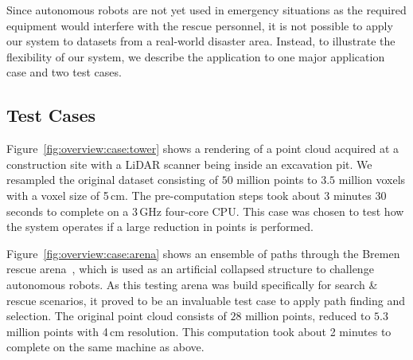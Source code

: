 \documentclass[conference,10pt,letter]{IEEEtran}
\begin{document}
Since autonomous robots are not yet used in emergency situations as the required equipment would interfere with the rescue personnel, it is not possible to apply our system to datasets from a real-world disaster area. Instead, to illustrate the flexibility of our system, we describe the application to one major application case and two test cases.

\subsection{Test Cases} \label{sec:results:testcases}
 Figure~\ref{fig:overview:case:tower} shows a rendering of a point cloud acquired at a construction site with a LiDAR scanner being inside an excavation pit. We resampled the original dataset consisting of $50$ million points to $3.5$ million voxels with a voxel size of 5\,cm. The pre-computation steps took about 3 minutes 30 seconds to complete on a 3\,GHz four-core CPU. This case was chosen to test how the system operates if a large reduction in points is performed.

 Figure~\ref{fig:overview:case:arena} shows an ensemble of paths through the Bremen rescue arena~\cite{varsadan08}, which is used as an artificial collapsed structure to challenge autonomous robots. As this testing arena was build specifically for search \& rescue scenarios, it proved to be an invaluable test case to apply path finding and selection. The original point cloud consists of $28$ million points, reduced to $5.3$ million points with 4\,cm resolution. This computation took about 2 minutes to complete on the same machine as above.
\end{document}
